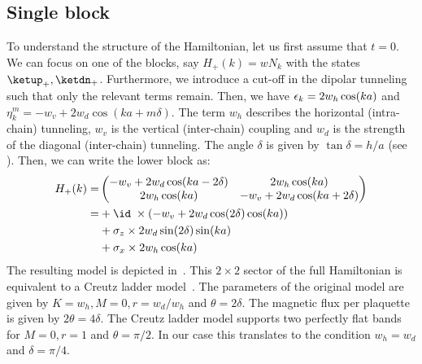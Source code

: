
\subsection{Single block}


To understand the structure of the Hamiltonian, let us first assume that $t=0$. We can focus on one of the blocks, say $H_+(k) = w N_k$ with the states $\ketup_+, \ketdn_+$.
Furthermore, we introduce a cut-off in the dipolar tunneling such that only the relevant terms remain.
Then, we have $\operatorname{\epsilon}_k = 2 w_h \cos(ka)$ and $\eta_k^m = -w_v + 2 w_d \cos(ka + m\delta)$. The term $w_h$ describes the horizontal (intra-chain) tunneling, $w_v$ is the vertical (inter-chain) coupling and $w_d$ is the strength of the diagonal (inter-chain) tunneling. The angle $\delta$ is given by $\tan \delta = h/a$ (see ).
Then, we can write the lower block as:
\begin{align}
    H_+(k) = &\begin{pmatrix}
        -w_v + 2w_d \cos(ka-2\delta) & 2w_h \cos(ka) \\
        2w_h\cos(ka) & -w_v + 2w_d \cos(ka+2\delta)
    \end{pmatrix} \\
    = &+\id \; \times (-w_v + 2w_d \cos(2\delta) \cos(ka)) \\
    &+\sigma_z \times 2w_d \sin(2\delta) \sin(ka) \\
    &+\sigma_x \times 2w_h \cos(ka)
\end{align}
The resulting model is depicted in~.
This $2\times 2$ sector of the full Hamiltonian is equivalent to a Creutz ladder model~\cite{Creutz1999,Tovmasyan2013a}. The parameters of the original model are given by $K=w_h, M=0, r=w_d/w_h$ and $\theta=2\delta$. The magnetic flux per plaquette is given by $2\theta=4\delta$. The Creutz ladder model supports two perfectly flat bands for $M=0, r=1$ and $\theta=\pi/2$. In our case this translates to the condition $w_h=w_d$ and $\delta=\pi/4$.


